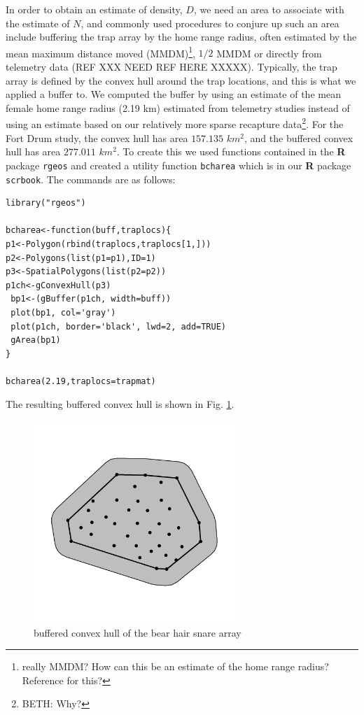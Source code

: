 In order to obtain an estimate of density, $D$, we need an area to
associate with the estimate of $N$, and commonly used procedures to
conjure up such an area include buffering the trap array by the home
range radius, often estimated by the mean maximum distance moved
(MMDM)\footnote{really MMDM? How can this be an estimate of the home
  range radius? Reference for this?}, $1/2$ MMDM \citep{dice:1938} or
directly from telemetry data (REF XXX NEED REF HERE XXXXX). Typically, the trap
array is defined by the convex hull around the trap locations, and
this is what we applied a buffer to. We computed the buffer by using
an estimate of the mean female home range radius (2.19 km) estimated from
telemetry studies \citep{bales_etal:2005} instead of using an estimate
based on our relatively more sparse recapture data\footnote{BETH:
  Why?}.
 For the Fort Drum study, the convex hull has area
$157.135$ $km^2$, and the buffered convex hull has area $277.011$
$km^2$.
To create this we used functions contained in the {\bf R} package
\mbox{\tt rgeos} and created a utility function \mbox{\tt bcharea}
which is in our {\bf R} package \mbox{\tt scrbook}. The commands are
as follows:
\begin{verbatim}
library("rgeos")

bcharea<-function(buff,traplocs){
p1<-Polygon(rbind(traplocs,traplocs[1,]))
p2<-Polygons(list(p1=p1),ID=1)
p3<-SpatialPolygons(list(p2=p2))
p1ch<-gConvexHull(p3)
 bp1<-(gBuffer(p1ch, width=buff))
 plot(bp1, col='gray')
 plot(p1ch, border='black', lwd=2, add=TRUE)
 gArea(bp1)
}

bcharea(2.19,traplocs=trapmat)
\end{verbatim}
The resulting buffered convex hull is shown in Fig. \ref{closed.fig.bch}.
\begin{figure}
\begin{center}
\includegraphics[height=3in,width=3in]{Ch3/figs/bufferedCH}
\end{center}
\caption{buffered convex hull of the bear hair snare array}
\label{closed.fig.bch}
\end{figure}

